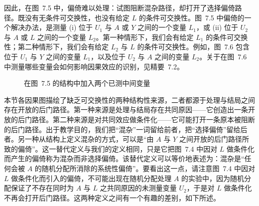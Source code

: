 因此，在图~7.5 中，偏倚难以处理：试图阻断混杂路径，却打开了选择偏倚路径。既没有无条件可交换性，也没有给定 $L$ 的条件可交换性。图~7.5 中偏倚的一个解决办法，是测量 (i) 位于 $U_1$ 与 $A$ 或 $Y$ 之间的一个变量 $L_1$，或 (ii) 位于 $U_2$ 与 $A$ 或 $L$ 之间的一个变量 $L_2$。第一种情形下，我们会有给定 $L_1$ 的条件可交换性；第二种情形下，我们会有给定 $L_2$ 与 $L$ 的条件可交换性。例如，图~7.6 包含位于 $U_1$ 与 $Y$ 之间的变量 $L_1$，以及位于 $U_2$ 与 $A$ 之间的变量 $L_2$。关于在图~7.6 中测量哪些变量会如何影响因果效应的识别，见精要~7.2。

\begin{figure}[htbp]
\centering
{}
\caption{在图~7.5 的结构中加入两个已测中间变量}
\label{fig:7.6}
\end{figure}

本节各因果图描绘了缺乏可交换性的两种结构性来源，二者都源于处理与结局之间存在开放的后门路径。第一种来源是处理与结局存在共同原因——它创造出一条开放的后门路径。第二种来源是对共同效应做条件化——它可能打开一条原本被阻断的后门路径。出于教学目的，我们把“混杂”一词留给前者，把“选择偏倚”留给后者。另一种从结构上定义混杂的方式，可以是“由 $A$ 与 $Y$ 之间开放的后门路径所致的偏倚”。这一替代定义与我们的定义相同，只是它把图~7.4 中因对 $L$ 做条件化而产生的偏倚称为混杂而非选择偏倚。该替代定义可以等价地表述为：混杂是“任何会被 $A$ 的随机分配所消除的系统性偏倚”。要看出这一点，请注意图~7.4 中因对 $L$ 做条件化而引入的偏倚，不可能出现在随机分配处理 $A$ 的实验中，因为随机分配保证了不存在同时为 $A$ 与 $L$ 之共同原因的未测量变量 $U_2$，于是对 $L$ 做条件化不再会打开后门路径。这两种定义之间有一个有趣的差别，如下所述。

